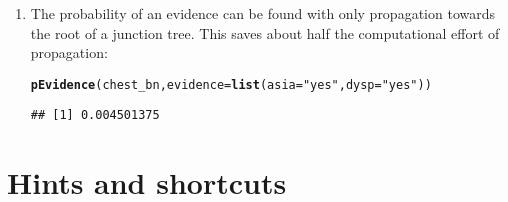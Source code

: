 \documentclass[10pt]{article}\usepackage[]{graphicx}\usepackage[]{xcolor}
\makeatletter
\newcommand{\hlstr}[1]{\textcolor[rgb]{0.192,0.494,0.8}{#1}}%
\newcommand{\hlstd}[1]{\textcolor[rgb]{0.345,0.345,0.345}{#1}}%
\newcommand{\hlkwc}[1]{\textcolor[rgb]{0.333,0.667,0.333}{#1}}%
\newcommand{\hlkwd}[1]{\textcolor[rgb]{0.737,0.353,0.396}{\textbf{#1}}}%
\newenvironment{kframe}{%
 \def\at@end@of@kframe{}%
 \ifinner\ifhmode%
  \def\at@end@of@kframe{\end{minipage}}%
  \begin{minipage}{\columnwidth}%
 \fi\fi%
 \def\FrameCommand##1{\hskip\@totalleftmargin \hskip-\fboxsep
 \colorbox{shadecolor}{##1}\hskip-\fboxsep
     \hskip-\linewidth \hskip-\@totalleftmargin \hskip\columnwidth}%
 \MakeFramed {\advance\hsize-\width
   \@totalleftmargin\z@ \linewidth\hsize
   \@setminipage}}%
 {\par\unskip\endMakeFramed%
 \at@end@of@kframe}
\newenvironment{knitrout}{}{} %
\makeatother
\begin{document}
\begin{enumerate}
\item The probability of an evidence can be found with only
  propagation towards the root of a junction tree. This saves about
  half the computational effort of propagation:

\begin{knitrout}
\color{fgcolor}\begin{kframe}
\begin{alltt}
\hlkwd{pEvidence}\hlstd{(chest_bn,} \hlkwc{evidence}\hlstd{=}\hlkwd{list}\hlstd{(}\hlkwc{asia}\hlstd{=}\hlstr{"yes"}\hlstd{,} \hlkwc{dysp}\hlstd{=}\hlstr{"yes"}\hlstd{))}
\end{alltt}
\begin{verbatim}
## [1] 0.004501375
\end{verbatim}
\end{kframe}
\end{knitrout}


\end{enumerate}


\section{Hints and shortcuts}
\label{sec:small-shortcuts}
\end{document}
